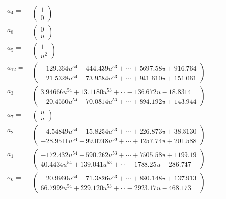 \documentclass[1p]{elsarticle_modified}
\theoremstyle{definition}
\begin{document}
\begin{tabular}{m{7pt} m{180pt} m{7pt} m{180pt} }
\flushright $a_{4}=$&$\begin{pmatrix}1\\0\end{pmatrix}$ \\
\flushright $a_{8}=$&$\begin{pmatrix}0\\u\end{pmatrix}$ \\
\flushright $a_{5}=$&$\begin{pmatrix}1\\u^2\end{pmatrix}$ \\
\flushright $a_{12}=$&$\begin{pmatrix}-129.364 u^{54}-444.439 u^{53}+\cdots+5697.58 u+916.764\\-21.5328 u^{54}-73.9584 u^{53}+\cdots+941.610 u+151.061\end{pmatrix}$ \\
\flushright $a_{3}=$&$\begin{pmatrix}3.94666 u^{54}+13.1180 u^{53}+\cdots-136.672 u-18.8314\\-20.4560 u^{54}-70.0814 u^{53}+\cdots+894.192 u+143.944\end{pmatrix}$ \\
\flushright $a_{7}=$&$\begin{pmatrix}u\\u\end{pmatrix}$ \\
\flushright $a_{2}=$&$\begin{pmatrix}-4.54849 u^{54}-15.8254 u^{53}+\cdots+226.873 u+38.8130\\-28.9511 u^{54}-99.0248 u^{53}+\cdots+1257.74 u+201.588\end{pmatrix}$ \\
\flushright $a_{1}=$&$\begin{pmatrix}-172.432 u^{54}-590.262 u^{53}+\cdots+7505.58 u+1199.19\\40.4434 u^{54}+139.041 u^{53}+\cdots-1788.25 u-286.747\end{pmatrix}$ \\
\flushright $a_{6}=$&$\begin{pmatrix}-20.9960 u^{54}-71.3826 u^{53}+\cdots+880.148 u+137.913\\66.7999 u^{54}+229.120 u^{53}+\cdots-2923.17 u-468.173\end{pmatrix}$ \\

\end{tabular}
\end{document}
